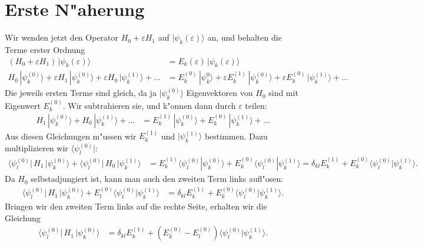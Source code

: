 
\section{Erste N"aherung\label{section:erstenaeherung}}
Wir wenden jetzt den Operator $H_0+\varepsilon H_1$ auf
$|\psi_k(\varepsilon)\rangle$ an, und behalten die Terme erster Ordnung
\begin{align*}
(H_0+\varepsilon H_1)\,|\psi_k(\varepsilon)\rangle
&=
E_k(\varepsilon)\,|\psi_k(\varepsilon)\rangle
\\
H_0\,|\psi_k^{(0)}\rangle +\varepsilon H_1\,|\psi_k^{(0)}\rangle
+\varepsilon H_0\,|\psi_k^{(1)}\rangle
+\dots
&=
E_k^{(0)}\,|\psi_k^{0}\rangle + \varepsilon E_k^{(1)} \,|\psi_k^{(0)}\rangle
+ \varepsilon E_k^{(0)} \,|\psi_k^{(1)}\rangle + \dots
\end{align*}
Die jeweils ersten Terme sind gleich, da ja $|\psi_k^{(0)}\rangle$
Eigenvektoren von $H_0$ sind mit Eigenwert $E_k^{(0)}$. Wir subtrahieren sie,
und k"onnen dann durch $\varepsilon$ teilen:
\begin{align*}
H_1\,|\psi_k^{(0)}\rangle
+H_0\,|\psi_k^{(1)}\rangle
+ \dots
&=
E_k^{(1)}\,|\psi_k^{(0)}\rangle + E_k^{(0)} \,|\psi_k^{(1)}\rangle+\dots
\end{align*}
Aus diesen Gleichungen m"ussen wir $E_k^{(1)}$ und $|\psi_k^{(1)}\rangle$
bestimmen. Dazu multiplizieren wir $\langle \psi_l^{(0)}|$:
\begin{align*}
\langle \psi_l^{(0)}|\, H_1 \,|\psi_k^{(0)}\rangle
+
\langle \psi_l^{(0)}|\, H_0 \,|\psi_k^{(1)}\rangle
&=
E_k^{(1)}\langle\psi_l^{(0)}|\psi_k^{(0)}\rangle
+
E_k^{(0)}\langle\psi_l^{(0)}|\psi_k^{(1)}\rangle
=
\delta_{kl} E_k^{(1)}
+
E_k^{(0)}\langle\psi_l^{(0)}|\psi_k^{(1)}\rangle.
\end{align*}
Da $H_0$ selbstadjungiert ist, kann man auch den zweiten Term links
aufl"osen:
\begin{align*}
\langle \psi_l^{(0)}|\, H_1 \,|\psi_k^{(0)}\rangle
+
E_l^{(0)}\langle \psi_l^{(0)}|\psi_k^{(1)}\rangle
&=
\delta_{kl} E_k^{(1)}
+
E_k^{(0)}\langle\psi_l^{(0)}|\psi_k^{(1)}\rangle.
\end{align*}
Bringen wir den zweiten Term links auf die rechte Seite, erhalten wir
die Gleichung
\begin{align*}
\langle \psi_l^{(0)}|\, H_1 \,|\psi_k^{(0)}\rangle
&=
\delta_{kl} E_k^{(1)}
+
(E_k^{(0)}-E_l^{(0)})\langle\psi_l^{(0)}|\psi_k^{(1)}\rangle.
\end{align*}


